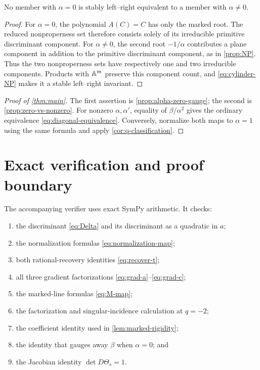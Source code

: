 \documentclass[11pt,reqno]{amsart}
\begin{document}
\begin{proposition}
\label{prop:zero-vs-nonzero}
No member with \(\alpha=0\) is stably left--right equivalent to a member
with \(\alpha\ne0\).
\end{proposition}

\begin{proof}
For \(\alpha=0\), the polynomial \(A(C)=C\) has only the marked root.
The reduced nonproperness set therefore consists solely of its irreducible
primitive discriminant component.  For \(\alpha\ne0\), the second root
\(-1/\alpha\) contributes a plane component in addition to the primitive
discriminant component, as in \cref{prop:NP}.  Thus the two nonproperness
sets have respectively one and two irreducible components.  Products with
\(\mathbb A^m\) preserve this component count, and
\eqref{eq:cylinder-NP} makes it a stable left--right invariant.
\end{proof}

\begin{proof}[Proof of \cref{thm:main}]
The first assertion is \cref{prop:alpha-zero-gauge}; the second is
\cref{prop:zero-vs-nonzero}.  For nonzero \(\alpha,\alpha'\), equality of
\(\beta/\alpha^2\) gives the ordinary equivalence
\eqref{eq:diagonal-equivalence}.  Conversely, normalize both maps to
\(\alpha=1\) using the same formula and apply
\cref{cor:q-classification}.
\end{proof}

\section{Exact verification and proof boundary}
\label{sec:verification}

The accompanying verifier uses exact SymPy arithmetic.  It checks:
\begin{enumerate}[label=(\arabic*)]
\item the discriminant \eqref{eq:Delta} and its discriminant as a quadratic
in \(a\);
\item the normalization formulas \eqref{eq:normalization-map};
\item both rational-recovery identities \eqref{eq:recover-t};
\item all three gradient factorizations
\eqref{eq:grad-a}--\eqref{eq:grad-c};
\item the marked-line formulas \eqref{eq:M-map};
\item the factorization and singular-incidence calculation at \(q=-2\);
\item the coefficient identity used in \cref{lem:marked-rigidity};
\item the identity that gauges away \(\beta\) when \(\alpha=0\); and
\item the Jacobian identity \(\det D\Theta_s=1\).
\end{enumerate}
\end{document}
